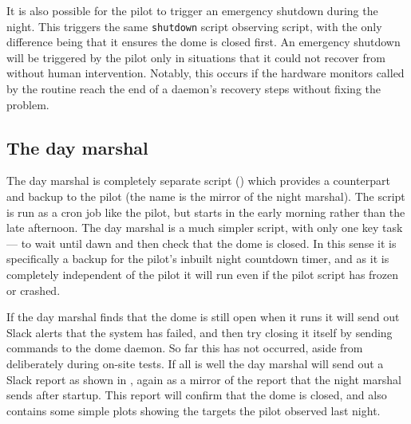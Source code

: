 \begin{colsection}
\begin{colsection}
\newpage

It is also possible for the pilot to trigger an emergency shutdown during the night. This triggers the same \texttt{shutdown} script observing script, with the only difference being that it ensures the dome is closed first. An emergency shutdown will be triggered by the pilot only in situations that it could not recover from without human intervention. Notably, this occurs if the hardware monitors called by the  routine reach the end of a daemon's recovery steps without fixing the problem.

\end{colsection}

\subsection{The day marshal}
\label{sec:day_marshal}
\begin{colsection}

The day marshal is completely separate script () which provides a counterpart and backup to the pilot (the name is the mirror of the night marshal). The script is run as a cron job like the pilot, but starts in the early morning rather than the late afternoon. The day marshal is a much simpler script, with only one key task --- to wait until dawn and then check that the dome is closed. In this sense it is specifically a backup for the pilot's inbuilt night countdown timer, and as it is completely independent of the pilot it will run even if the pilot script has frozen or crashed.

If the day marshal finds that the dome is still open when it runs it will send out Slack alerts that the system has failed, and then try closing it itself by sending commands to the dome daemon. So far this has not occurred, aside from deliberately during on-site tests. If all is well the day marshal will send out a Slack report as shown in , again as a mirror of the report that the night marshal sends after startup. This report will confirm that the dome is closed, and also contains some simple plots showing the targets the pilot observed last night.

\end{colsection}


\end{colsection}


